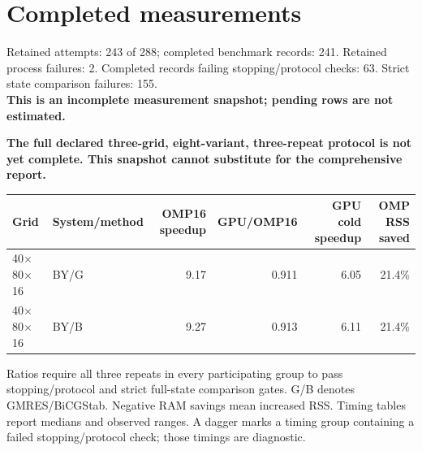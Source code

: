\documentclass[11pt]{article}
\begin{document}
\section{Completed measurements}
Retained attempts: 243 of 288; completed benchmark records: 241. Retained process failures: 2. Completed records failing stopping/protocol checks: 63. Strict state comparison failures: 155.\\
\textbf{This is an incomplete measurement snapshot; pending rows are not estimated.}\par
\textbf{The full declared three-grid, eight-variant, three-repeat protocol is not yet complete. This snapshot cannot substitute for the comprehensive report.}\par
\begin{center}\small\begin{tabular}{llrrrr}\toprule Grid & System/method & OMP16 speedup & GPU/OMP16 & GPU cold speedup & OMP RSS saved\\\midrule
40$\times$80$\times$16 & BY/G & 9.17 & 0.911 & 6.05 & 21.4\%\\
40$\times$80$\times$16 & BY/B & 9.27 & 0.913 & 6.11 & 21.4\%\\
\bottomrule\end{tabular}\end{center}
Ratios require all three repeats in every participating group to pass stopping/protocol and strict full-state comparison gates. G/B denotes GMRES/BiCGStab. Negative RAM savings mean increased RSS. Timing tables report medians and observed ranges. A dagger marks a timing group containing a failed stopping/protocol check; those timings are diagnostic.
\end{document}
